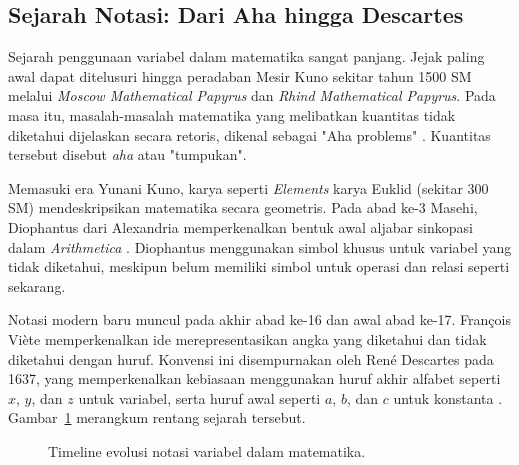 \documentclass[11pt,a4paper]{article}
\begin{document}
\subsection{Sejarah Notasi: Dari Aha hingga Descartes}

Sejarah penggunaan variabel dalam matematika sangat panjang. Jejak paling awal dapat ditelusuri hingga peradaban Mesir Kuno sekitar tahun 1500 SM melalui \textit{Moscow Mathematical Papyrus} dan \textit{Rhind Mathematical Papyrus}. Pada masa itu, masalah-masalah matematika yang melibatkan kuantitas tidak diketahui dijelaskan secara retoris, dikenal sebagai "Aha problems" \cite{wikipedia_math}. Kuantitas tersebut disebut \textit{aha} atau "tumpukan".

Memasuki era Yunani Kuno, karya seperti \textit{Elements} karya Euklid (sekitar 300 SM) mendeskripsikan matematika secara geometris. Pada abad ke-3 Masehi, Diophantus dari Alexandria memperkenalkan bentuk awal aljabar sinkopasi dalam \textit{Arithmetica} \cite{boyer}. Diophantus menggunakan simbol khusus untuk variabel yang tidak diketahui, meskipun belum memiliki simbol untuk operasi dan relasi seperti sekarang.

Notasi modern baru muncul pada akhir abad ke-16 dan awal abad ke-17. François Viète memperkenalkan ide merepresentasikan angka yang diketahui dan tidak diketahui dengan huruf. Konvensi ini disempurnakan oleh René Descartes pada 1637, yang memperkenalkan kebiasaan menggunakan huruf akhir alfabet seperti \(x\), \(y\), dan \(z\) untuk variabel, serta huruf awal seperti \(a\), \(b\), dan \(c\) untuk konstanta \cite{wikipedia_math}. Gambar~\ref{fig:math-timeline} merangkum rentang sejarah tersebut.

\begin{figure}[H]
	\centering
	\caption{Timeline evolusi notasi variabel dalam matematika.}
	\label{fig:math-timeline}
\end{figure}
\end{document}
